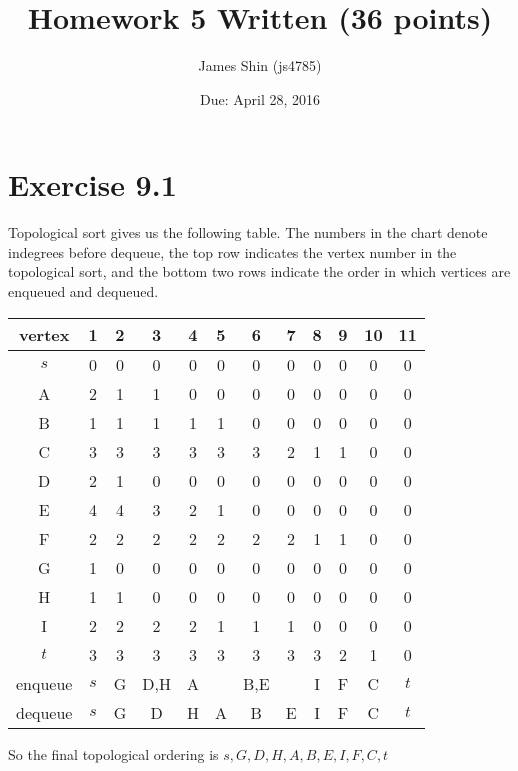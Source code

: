\documentclass[12pt]{article}
\title{Homework 5 Written (36 points)}
\author{James Shin (js4785)}
\date{Due: April 28, 2016}
\begin{document}
\maketitle

\section{Exercise 9.1}
Topological sort gives us the following table. The numbers in the chart denote indegrees before dequeue, the top row indicates the vertex number in the topological sort, and the bottom two rows indicate the order in which vertices are enqueued and dequeued.
\begin{center}
\begin{tabular}{ c|c|c|c|c|c|c|c|c|c|c|c } 
vertex & 1 & 2 & 3 & 4 & 5 & 6 & 7 & 8 & 9 & 10 & 11 \\
 \hline
 $s$ & 0 & 0 & 0 & 0 & 0 & 0 & 0 & 0 & 0 & 0 & 0 \\
 A & 2 & 1 & 1 & 0 & 0 & 0 & 0 & 0 & 0 & 0 & 0 \\
 B & 1 & 1 & 1 & 1 & 1 & 0 & 0 & 0 & 0 & 0 & 0 \\
 C & 3 & 3 & 3 & 3 & 3 & 3 & 2 & 1 & 1 & 0 & 0 \\
 D & 2 & 1 & 0 & 0 & 0 & 0 & 0 & 0 & 0 & 0 & 0 \\
 E & 4 & 4 & 3 & 2 & 1 & 0 & 0 & 0 & 0 & 0 & 0 \\
 F & 2 & 2 & 2 & 2 & 2 & 2 & 2 & 1 & 1 & 0 & 0 \\
 G & 1 & 0 & 0 & 0 & 0 & 0 & 0 & 0 & 0 & 0 & 0 \\
 H & 1 & 1 & 0 & 0 & 0 & 0 & 0 & 0 & 0 & 0 & 0 \\
 I & 2 & 2 & 2 & 2 & 1 & 1 & 1 & 0 & 0 & 0 & 0 \\
 $t$ & 3 & 3 & 3 & 3 & 3 & 3 & 3 & 3 & 2 & 1 & 0 \\
 \hline
 enqueue & $s$ & G & D,H & A &  & B,E &  & I & F & C & $t$ \\
 dequeue & $s$ & G & D & H & A & B & E & I & F & C & $t$ \\
\end{tabular}
\end{center}

So the final topological ordering is $\boxed{s,G,D,H,A,B,E,I,F,C,t}$
\end{document}
